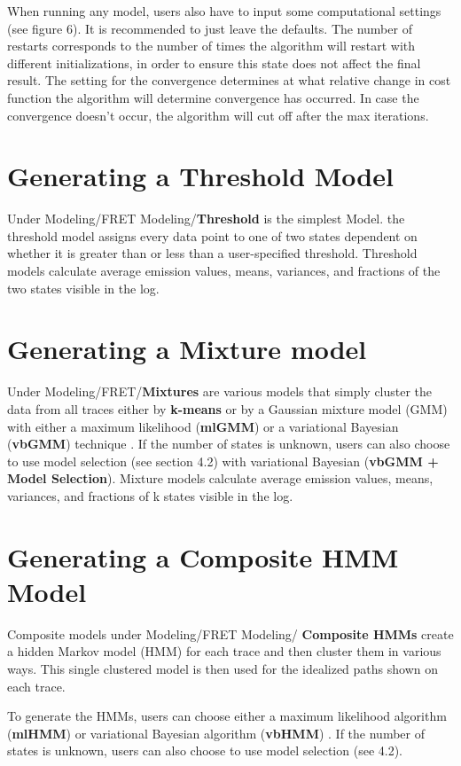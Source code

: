 \documentclass[11pt,a5paper,footinclude=true,headinclude=true]{scrbook} %
\begin{document}
When running any model, users also have to input some computational settings (see figure 6). It is recommended to just leave the defaults. The number of restarts corresponds to the number of times the algorithm will restart with different initializations, in order to ensure this state does not affect the final result. The setting for the convergence determines at what relative change in cost function the algorithm will determine convergence has occurred. In case the convergence doesn't occur, the algorithm will cut off after the max iterations.



\section{Generating a Threshold Model}
Under Modeling/FRET Modeling/\textbf{Threshold} is the simplest Model. the threshold model assigns every data point to one of two states dependent on whether it is greater than or less than a user-specified threshold. Threshold models calculate average emission values, means, variances, and fractions of the two states visible in the log.

 \section{Generating a Mixture model}
 
 Under Modeling/FRET/\textbf{Mixtures} are various models that simply cluster the data from all traces either by \textbf{k-means} or by a Gaussian mixture model (GMM) with either a maximum likelihood (\textbf{mlGMM}) or a variational Bayesian (\textbf{vbGMM}) technique \cite{Bishop2006Pattern}.  If the number of states is unknown, users can also choose to use model selection (see section 4.2) with variational Bayesian (\textbf{vbGMM + Model Selection}). Mixture models calculate average emission values, means, variances, and fractions of k states visible in the log.

 \section{Generating a Composite HMM Model}
Composite models under Modeling/FRET Modeling/ \textbf{Composite HMMs} create a hidden Markov model (HMM) for each trace and then cluster them in various ways. This single  clustered model is then used for the idealized paths shown on each trace. 

To generate the HMMs, users can choose either a maximum likelihood algorithm (\textbf{mlHMM})\cite{MCKINNEY20061941} or variational Bayesian algorithm (\textbf{vbHMM}) \cite{bronson}. If the number of states is unknown, users can also choose to use model selection (see 4.2). 
\end{document}
